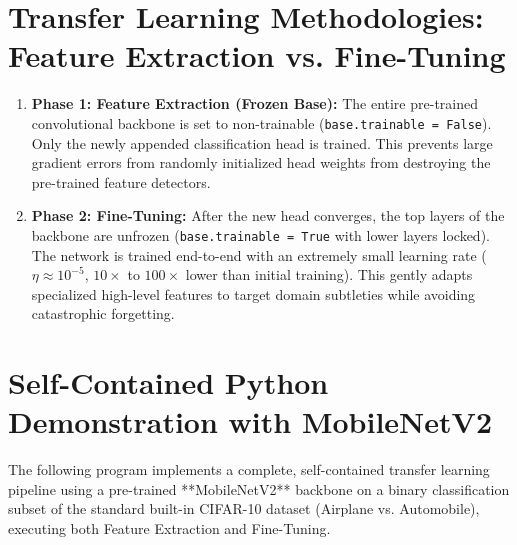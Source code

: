 \documentclass[12pt,a4paper]{article}
\begin{document}
\section{Transfer Learning Methodologies: Feature Extraction vs. Fine-Tuning}
\begin{center}
\end{center}

\begin{enumerate}[leftmargin=*]
\item \textbf{Phase 1: Feature Extraction (Frozen Base):}
The entire pre-trained convolutional backbone is set to non-trainable (\texttt{base.trainable = False}). Only the newly appended classification head is trained. This prevents large gradient errors from randomly initialized head weights from destroying the pre-trained feature detectors.
\item \textbf{Phase 2: Fine-Tuning:}
After the new head converges, the top layers of the backbone are unfrozen (\texttt{base.trainable = True} with lower layers locked). The network is trained end-to-end with an extremely small learning rate ($\eta \approx 10^{-5}$, $10\times$ to $100\times$ lower than initial training). This gently adapts specialized high-level features to target domain subtleties while avoiding catastrophic forgetting.
\end{enumerate}

\section{Self-Contained Python Demonstration with MobileNetV2}
The following program implements a complete, self-contained transfer learning pipeline using a pre-trained **MobileNetV2** backbone on a binary classification subset of the standard built-in CIFAR-10 dataset (Airplane vs. Automobile), executing both Feature Extraction and Fine-Tuning.
\end{document}
